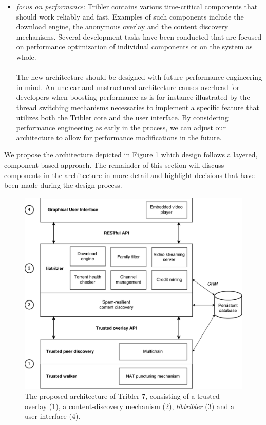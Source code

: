 \begin{itemize}
	\item \emph{focus on performance}: Tribler contains various time-critical components that should work reliably and fast. Examples of such components include the download engine, the anonymous overlay and the content discovery mechanisms. Several development tasks have been conducted that are focused on performance optimization of individual components or on the system as whole.\\\\
	The new architecture should be designed with future performance engineering in mind. An unclear and unstructured architecture causes overhead for developers when boosting performance as is for instance illustrated by the thread switching mechanisms necessaries to implement a specific feature that utilizes both the Tribler core and the user interface. By considering performance engineering as early in the process, we can adjust our architecture to allow for performance modifications in the future.
\end{itemize}
We propose the architecture depicted in Figure \ref{fig:tribler7} which design follows a layered, component-based approach. The remainder of this section will discuss components in the architecture in more detail and highlight decisions that have been made during the design process.

\begin{figure}[h!]
	\centering
	\includegraphics[width=0.9\columnwidth]{images/architecture/tribler7}
	\caption{The proposed architecture of Tribler 7, consisting of a trusted overlay (1), a content-discovery mechanism (2), \emph{libtribler} (3) and a user interface (4).}
	\label{fig:tribler7}
\end{figure}

